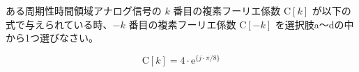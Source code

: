 ある周期性時間領域アナログ信号の $k$ 番目の複素フーリエ係数 $\textrm{C}[k]$ が以下の式で与えられている時、$-k$ 番目の複素フーリエ係数 $\textrm{C}[-k]$ を選択肢a〜dの中から1つ選びなさい。

\[
\textrm{C}[k] = 4 \cdot \textrm{e}^{\{ j \cdot \pi/8 \}}
\]
